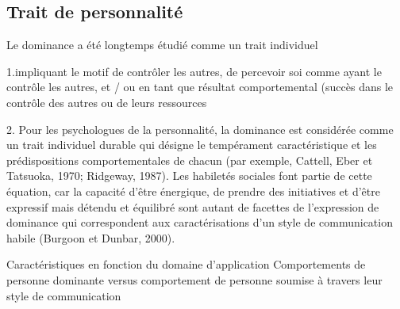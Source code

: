 \subsection{Trait de personnalité}
Le dominance a été longtemps étudié comme un trait individuel 

1.impliquant le motif de contrôler les autres, de percevoir soi comme ayant le contrôle les autres, et / ou en tant que résultat comportemental (succès dans le contrôle des autres ou de leurs ressources \cite{hall2005nonverbal}

2. Pour les psychologues de la personnalité, la dominance est considérée comme un trait individuel durable qui désigne le tempérament caractéristique et les prédispositions comportementales de chacun (par exemple, Cattell, Eber et Tatsuoka, 1970; Ridgeway, 1987).
Les habiletés sociales font partie de cette équation, car la capacité d'être énergique, de prendre des initiatives et d'être expressif mais détendu et équilibré sont autant de facettes de l'expression de dominance qui correspondent aux caractérisations d'un style de communication habile (Burgoon et Dunbar, 2000).


Caractéristiques en fonction du domaine d'application
Comportements de personne dominante versus comportement de personne soumise à travers leur style de communication
